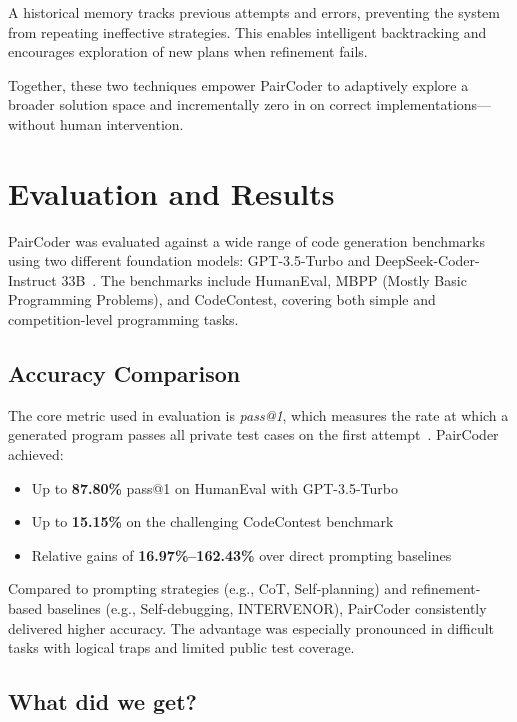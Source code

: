 \documentclass[11pt,a4paper]{article}
\begin{document}
A historical memory tracks previous attempts and errors, preventing the system from repeating ineffective strategies. This enables intelligent backtracking and encourages exploration of new plans when refinement fails.

Together, these two techniques empower PairCoder to adaptively explore a broader solution space and incrementally zero in on correct implementations—without human intervention.
\section{Evaluation and Results}
PairCoder was evaluated against a wide range of code generation benchmarks using two different foundation models: GPT-3.5-Turbo and DeepSeek-Coder-Instruct 33B~\cite{zhang2024paircoder}. The benchmarks include HumanEval, MBPP (Mostly Basic Programming Problems), and CodeContest, covering both simple and competition-level programming tasks.

\subsection{Accuracy Comparison}
The core metric used in evaluation is \textit{pass@1}, which measures the rate at which a generated program passes all private test cases on the first attempt~\cite{zhang2024paircoder}. PairCoder achieved:
\begin{itemize}
\item Up to \textbf{87.80\%} pass@1 on HumanEval with GPT-3.5-Turbo
\item Up to \textbf{15.15\%} on the challenging CodeContest benchmark
\item Relative gains of \textbf{16.97\%–162.43\%} over direct prompting baselines
\end{itemize}

Compared to prompting strategies (e.g., CoT, Self-planning) and refinement-based baselines (e.g., Self-debugging, INTERVENOR), PairCoder consistently delivered higher accuracy. The advantage was especially pronounced in difficult tasks with logical traps and limited public test coverage.


\subsection{What did we get?}
\end{document}

